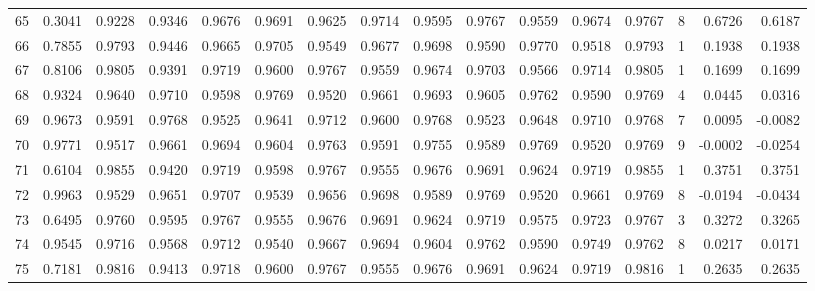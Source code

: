 \begin{tabular}{lrrrrrrrrrrrrrrr}
65  &      0.3041 &  0.9228 &  0.9346 &  0.9676 &  0.9691 &  0.9625 &  0.9714 &  0.9595 &  0.9767 &  0.9559 &   0.9674 &     0.9767 &      8 &                    0.6726 &                     0.6187 \\
66  &      0.7855 &  0.9793 &  0.9446 &  0.9665 &  0.9705 &  0.9549 &  0.9677 &  0.9698 &  0.9590 &  0.9770 &   0.9518 &     0.9793 &      1 &                    0.1938 &                     0.1938 \\
67  &      0.8106 &  0.9805 &  0.9391 &  0.9719 &  0.9600 &  0.9767 &  0.9559 &  0.9674 &  0.9703 &  0.9566 &   0.9714 &     0.9805 &      1 &                    0.1699 &                     0.1699 \\
68  &      0.9324 &  0.9640 &  0.9710 &  0.9598 &  0.9769 &  0.9520 &  0.9661 &  0.9693 &  0.9605 &  0.9762 &   0.9590 &     0.9769 &      4 &                    0.0445 &                     0.0316 \\
69  &      0.9673 &  0.9591 &  0.9768 &  0.9525 &  0.9641 &  0.9712 &  0.9600 &  0.9768 &  0.9523 &  0.9648 &   0.9710 &     0.9768 &      7 &                    0.0095 &                    -0.0082 \\
70  &      0.9771 &  0.9517 &  0.9661 &  0.9694 &  0.9604 &  0.9763 &  0.9591 &  0.9755 &  0.9589 &  0.9769 &   0.9520 &     0.9769 &      9 &                   -0.0002 &                    -0.0254 \\
71  &      0.6104 &  0.9855 &  0.9420 &  0.9719 &  0.9598 &  0.9767 &  0.9555 &  0.9676 &  0.9691 &  0.9624 &   0.9719 &     0.9855 &      1 &                    0.3751 &                     0.3751 \\
72  &      0.9963 &  0.9529 &  0.9651 &  0.9707 &  0.9539 &  0.9656 &  0.9698 &  0.9589 &  0.9769 &  0.9520 &   0.9661 &     0.9769 &      8 &                   -0.0194 &                    -0.0434 \\
73  &      0.6495 &  0.9760 &  0.9595 &  0.9767 &  0.9555 &  0.9676 &  0.9691 &  0.9624 &  0.9719 &  0.9575 &   0.9723 &     0.9767 &      3 &                    0.3272 &                     0.3265 \\
74  &      0.9545 &  0.9716 &  0.9568 &  0.9712 &  0.9540 &  0.9667 &  0.9694 &  0.9604 &  0.9762 &  0.9590 &   0.9749 &     0.9762 &      8 &                    0.0217 &                     0.0171 \\
75  &      0.7181 &  0.9816 &  0.9413 &  0.9718 &  0.9600 &  0.9767 &  0.9555 &  0.9676 &  0.9691 &  0.9624 &   0.9719 &     0.9816 &      1 &                    0.2635 &                     0.2635 \\

\end{tabular}
